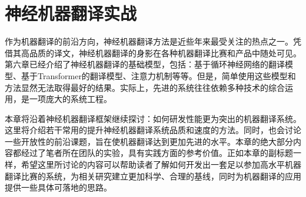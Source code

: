 
%


\renewcommand\figurename{图} %
\renewcommand\tablename{表}%


\chapter{神经机器翻译实战}

\parinterval 作为机器翻译的前沿方向，神经机器翻译方法是近些年来最受关注的热点之一。凭借其高品质的译文，神经机器翻译的身影在各种机器翻译比赛和产品中随处可见。第六章已经介绍了神经机器翻译的基础模型，包括：基于循环神经网络的翻译模型、基于Transformer的翻译模型、注意力机制等等。但是，简单使用这些模型和方法显然无法取得最好的结果。实际上，先进的系统往往依赖多种技术的综合运用，是一项庞大的系统工程。

\parinterval 本章将沿着神经机器翻译框架继续探讨：如何研发性能更为突出的机器翻译系统。这里将介绍若干常用的提升神经机器翻译系统品质和速度的方法。同时，也会讨论一些开放性的前沿课题，旨在使机器翻译达到更加先进的水平。本章的绝大部分内容都经过了笔者所在团队的实验，具有实践方面的参考价值。正如本章的副标题一样，希望这里所讨论的内容可以帮助读者了解如何开发出一套足以参加高水平机器翻译比赛的系统，为相关研究建立更加科学、合理的基线，同时为机器翻译的应用提供一些具体可落地的思路。



